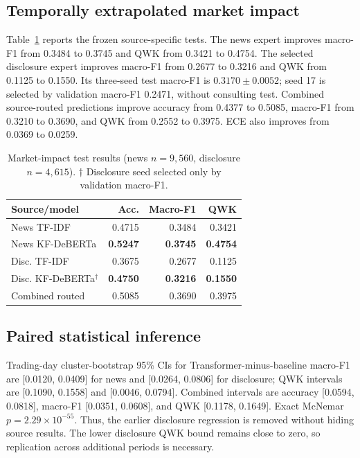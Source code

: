 \documentclass[11pt]{article}
\begin{document}
\subsection{Temporally extrapolated market impact}

Table~\ref{tab:impact} reports the frozen source-specific tests. The news expert improves macro-F1 from 0.3484 to 0.3745 and QWK from 0.3421 to 0.4754. The selected disclosure expert improves macro-F1 from 0.2677 to 0.3216 and QWK from 0.1125 to 0.1550. Its three-seed test macro-F1 is $0.3170\pm0.0052$; seed 17 is selected by validation macro-F1 0.2471, without consulting test. Combined source-routed predictions improve accuracy from 0.4377 to 0.5085, macro-F1 from 0.3210 to 0.3690, and QWK from 0.2552 to 0.3975. ECE also improves from 0.0369 to 0.0259.

\begin{table}[t]
\centering
\scriptsize
\begin{tabular}{@{}lrrr@{}}
\toprule
Source/model & Acc. & Macro-F1 & QWK \\
\midrule
News TF-IDF & 0.4715 & 0.3484 & 0.3421 \\
News KF-DeBERTa & \textbf{0.5247} & \textbf{0.3745} & \textbf{0.4754} \\
Disc. TF-IDF & 0.3675 & 0.2677 & 0.1125 \\
Disc. KF-DeBERTa$^\dagger$ & \textbf{0.4750} & \textbf{0.3216} & \textbf{0.1550} \\
Combined routed & 0.5085 & 0.3690 & 0.3975 \\
\bottomrule
\end{tabular}
\caption{Market-impact test results (news $n=9{,}560$, disclosure $n=4{,}615$). $\dagger$ Disclosure seed selected only by validation macro-F1.}
\label{tab:impact}
\end{table}

\subsection{Paired statistical inference}

Trading-day cluster-bootstrap 95\% CIs for Transformer-minus-baseline macro-F1 are [0.0120, 0.0409] for news and [0.0264, 0.0806] for disclosure; QWK intervals are [0.1090, 0.1558] and [0.0046, 0.0794]. Combined intervals are accuracy [0.0594, 0.0818], macro-F1 [0.0351, 0.0608], and QWK [0.1178, 0.1649]. Exact McNemar $p=2.29\times10^{-55}$. Thus, the earlier disclosure regression is removed without hiding source results. The lower disclosure QWK bound remains close to zero, so replication across additional periods is necessary.
\end{document}
